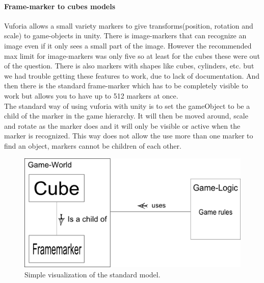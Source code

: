 \paragraph{Frame-marker to cubes models}
Vuforia allows a small variety markers to give transforms(position, rotation and scale) to game-objects in unity. There is image-markers that can recognize an image even if it only sees a small part of the image. However the recommended max limit for image-markers was only five so at least for the cubes these were out of the question. There is also markers with shapes like cubes, cylinders, etc. but we had trouble getting these features to work, due to lack of documentation. And then there is the standard frame-marker which has to be completely visible to work but allows you to have up to 512 markers at once.\\
The standard way of using vuforia with unity is to set the gameObject to be a child of the marker in the game hierarchy. It will then be moved around, scale and rotate as the marker does and it will only be visible or active when the marker is recognized. This way does not allow the use more than one marker to find an object, markers cannot be children of each other. 

\begin{figure}[ht] 
        \capstart
        \centering  
        \includegraphics[width=\textwidth]{includes/simpleCubeMarkerModel.png}    
        \caption[Standard Cube-Marker model]{Simple visualization of the standard model.} 
        \label{fig:simple_cube_marker_model} 
\end{figure}

